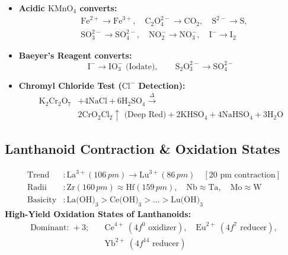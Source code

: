 \documentclass[10pt,twoside,openright]{book}
\begin{document}
\begin{usecasebox}
\begin{itemize}
  \item \textbf{Acidic $\text{KMnO}_4$ converts:}
  \begin{align*}
    &\text{Fe}^{2+} \to \text{Fe}^{3+}, \quad \text{C}_2\text{O}_4^{2-} \to \text{CO}_2, \quad \text{S}^{2-} \to \text{S}, \\
    &\text{SO}_3^{2-} \to \text{SO}_4^{2-}, \quad \text{NO}_2^- \to \text{NO}_3^-, \quad \text{I}^- \to \text{I}_2
  \end{align*}
  \item \textbf{Baeyer's Reagent converts:}
  \begin{equation*}
    \text{I}^- \to \text{IO}_3^- \text{ (Iodate)}, \qquad \text{S}_2\text{O}_3^{2-} \to \text{SO}_4^{2-}
  \end{equation*}
  \item \textbf{Chromyl Chloride Test ($\text{Cl}^-$ Detection):}
  \begin{align*}
    \text{K}_2\text{Cr}_2\text{O}_7 &+ 4\text{NaCl} + 6\text{H}_2\text{SO}_4 \xrightarrow{\Delta} \\
    &2\text{CrO}_2\text{Cl}_2\uparrow \text{ (Deep Red)} + 2\text{KHSO}_4 + 4\text{NaHSO}_4 + 3\text{H}_2\text{O}
  \end{align*}
\end{itemize}
\end{usecasebox}

\subsection{Lanthanoid Contraction \& Oxidation States}

\begin{formulabox}
\begin{align}
  \text{Trend} &: \text{La}^{3+} (106\,\si{pm}) \to \text{Lu}^{3+} (86\,\si{pm}) \quad [\text{20 pm contraction}] \\
  \text{Radii} &: \text{Zr} (160\,\si{pm}) \approx \text{Hf} (159\,\si{pm}), \quad \text{Nb} \approx \text{Ta}, \quad \text{Mo} \approx \text{W} \\
  \text{Basicity} &: \text{La(OH)}_3 > \text{Ce(OH)}_3 > \dots > \text{Lu(OH)}_3
\end{align}
\textbf{High-Yield Oxidation States of Lanthanoids:}
\begin{align}
  \text{Dominant: } +3; \quad &\text{Ce}^{4+} \ (4f^0 \text{ oxidizer}), \quad \text{Eu}^{2+} \ (4f^7 \text{ reducer}), \\
  &\text{Yb}^{2+} \ (4f^{14} \text{ reducer})
\end{align}
\end{formulabox}
\end{document}
